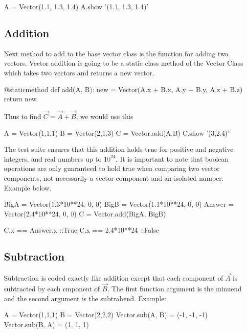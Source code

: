 \documentclass[15pt]{report}
\begin{document}
\begin{code}
A = Vector(1.1, 1.3, 1.4)
A.show
'(1.1, 1.3, 1.4)'
\end{code}

\subsection{Addition} Next method to add to the base vector class is the function for adding two vectors. Vector addition is going to be a static class method of the Vector Class which takes two vectors and returns a new vector.

\begin{code} 
    @staticmethod
    def add(A, B):
        new = Vector(A.x + B.x, 
                     A.y + B.y,
                     A.z + B.z)
        return new
\end{code}

Thus to find $\vec{C} =\vec{A} + \vec{B}$, we would use this

\begin{code}
A = Vector(1,1,1)
B = Vector(2,1,3)
C = Vector.add(A,B)
C.show
'(3,2,4)'
\end{code} 

The test suite ensures that this addition holds true for positive and negative integers, and real numbers up to $10^{24}$. It is important to note that boolean operations are only guaranteed to hold true when comparing two vector components, not necessarily a vector component and an isolated number. Example below.

\begin{code}
BigA = Vector(1.3*10**24, 0, 0)
BigB = Vector(1.1*10**24, 0, 0)
Answer = Vector(2.4*10**24, 0, 0)
C = Vector.add(BigA, BigB)

C.x == Answer.x        ::True
C.x == 2.4*10**24      ::False
\end{code} 

\subsection{Subtraction}Subtraction is coded exactly like addition except that each component of $\vec{A}$ is subtracted by each cmponent of $\vec{B}$. The first function argument is the minuend and the second argument is the subtrahend. Example:

\begin{code}
A = Vector(1,1,1)
B = Vector(2,2,2)
Vector.sub(A, B) = (-1, -1, -1)
Vector.sub(B, A) = (1, 1, 1)
\end{code}
\end{document}
